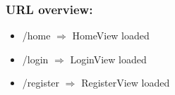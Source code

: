\subsubsection*{URL overview:}
\begin{itemize}
    \item /home $\Rightarrow$ HomeView loaded 
    \item /login $\Rightarrow$ LoginView loaded  
    \item /register $\Rightarrow$ RegisterView loaded  
\end{itemize}
































































































